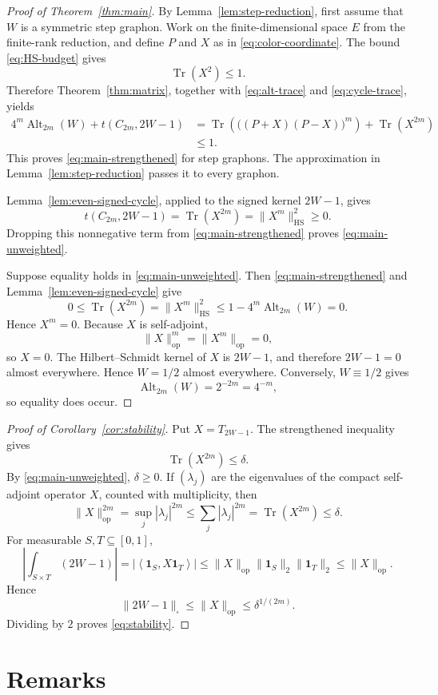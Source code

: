 \documentclass[11pt]{article}
\newcommand{\one}{\mathbf{1}}
\newcommand{\ip}[2]{\left\langle #1,#2\right\rangle}
\newcommand{\Tr}{\operatorname{Tr}}
\newcommand{\Alt}{\operatorname{Alt}}
\newcommand{\op}{\mathrm{op}}
\newcommand{\HS}{\mathrm{HS}}
\begin{document}
\begin{proof}[Proof of Theorem~\ref{thm:main}]
By Lemma~\ref{lem:step-reduction}, first assume that $W$ is a symmetric
step graphon.  Work on the finite-dimensional space $E$ from the
finite-rank reduction, and define $P$ and $X$ as in
\eqref{eq:color-coordinate}.
The bound \eqref{eq:HS-budget} gives
\[
  \Tr(X^2)\le1.
\]
Therefore Theorem~\ref{thm:matrix}, together with
\eqref{eq:alt-trace} and \eqref{eq:cycle-trace}, yields
\begin{align*}
  4^m\Alt_{2m}(W)+t(C_{2m},2W-1)
  &=
  \Tr\left(\bigl((P+X)(P-X)\bigr)^m\right)
  +\Tr(X^{2m})\\
  &\le1.
\end{align*}
This proves \eqref{eq:main-strengthened} for step graphons.  The
approximation in Lemma~\ref{lem:step-reduction} passes it to every
graphon.

Lemma~\ref{lem:even-signed-cycle}, applied to the signed kernel
$2W-1$, gives
\[
  t(C_{2m},2W-1)=\Tr(X^{2m})=\|X^m\|_{\HS}^2\ge0.
\]
Dropping this nonnegative term from
\eqref{eq:main-strengthened} proves \eqref{eq:main-unweighted}.

Suppose equality holds in \eqref{eq:main-unweighted}.  Then
\eqref{eq:main-strengthened} and Lemma~\ref{lem:even-signed-cycle} give
\[
  0\le\Tr(X^{2m})
  =\|X^m\|_{\HS}^2
  \le1-4^m\Alt_{2m}(W)
  =0.
\]
Hence $X^m=0$.  Because $X$ is self-adjoint,
\[
  \|X\|_{\op}^m=\|X^m\|_{\op}=0,
\]
so $X=0$.  The Hilbert--Schmidt kernel of $X$ is $2W-1$, and therefore
$2W-1=0$ almost everywhere.  Hence $W=1/2$ almost everywhere.
Conversely, $W\equiv1/2$ gives
\[
  \Alt_{2m}(W)=2^{-2m}=4^{-m},
\]
so equality does occur.
\end{proof}

\begin{proof}[Proof of Corollary~\ref{cor:stability}]
Put $X=T_{2W-1}$.  The strengthened inequality gives
\[
  \Tr(X^{2m})\le\delta.
\]
By \eqref{eq:main-unweighted}, $\delta\ge0$.  If $(\lambda_j)$ are the
eigenvalues of the compact self-adjoint operator $X$, counted with
multiplicity, then
\[
  \|X\|_{\op}^{2m}
  =\sup_j|\lambda_j|^{2m}
  \le\sum_j|\lambda_j|^{2m}
  =\Tr(X^{2m})
  \le\delta.
\]
For measurable $S,T\subseteq[0,1]$,
\[
  \left|\int_{S\times T}(2W-1)\right|
  =|\ip{\one_S}{X\one_T}|
  \le\|X\|_{\op}\|\one_S\|_2\|\one_T\|_2
  \le\|X\|_{\op}.
\]
Hence
\[
  \|2W-1\|_{\square}\le\|X\|_{\op}\le\delta^{1/(2m)}.
\]
Dividing by $2$ proves \eqref{eq:stability}.
\end{proof}

\section{Remarks}
\end{document}
